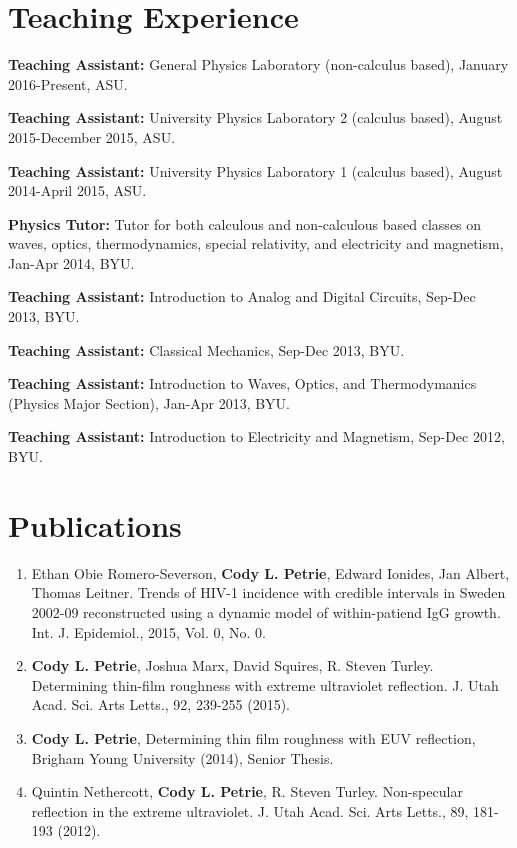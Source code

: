 \documentclass[letterpaper,10pt]{article}
\renewenvironment{itemize}{
  \begin{list}{}{
    \setlength{\leftmargin}{1.5em}
  }
}{
  \end{list}
}
\begin{document}
\section*{Teaching Experience}
\begin{itemize}
  \item \textbf{Teaching Assistant:} General Physics Laboratory (non-calculus based), January 2016-Present, ASU.
  \item \textbf{Teaching Assistant:} University Physics Laboratory 2 (calculus based), August 2015-December 2015, ASU.
  \item \textbf{Teaching Assistant:} University Physics Laboratory 1 (calculus based), August 2014-April 2015, ASU.
  \item \textbf{Physics Tutor:} Tutor for both calculous and non-calculous based classes on waves, optics, thermodynamics, special relativity, and electricity and magnetism, Jan-Apr 2014, BYU.
  \item \textbf{Teaching Assistant:} Introduction to Analog and Digital Circuits, Sep-Dec 2013, BYU.
  \item \textbf{Teaching Assistant:} Classical Mechanics, Sep-Dec 2013, BYU.
  \item \textbf{Teaching Assistant:} Introduction to Waves, Optics, and Thermodymanics (Physics Major Section), Jan-Apr 2013, BYU.
  \item \textbf{Teaching Assistant:} Introduction to Electricity and Magnetism, Sep-Dec 2012, BYU.
\end{itemize}

\section*{Publications}
\begin{enumerate}
   \item Ethan Obie Romero-Severson, \textbf{Cody L. Petrie}, Edward Ionides, Jan Albert, Thomas Leitner. Trends of HIV-1 incidence with credible intervals in Sweden 2002-09 reconstructed using a dynamic model of within-patiend IgG growth. Int. J. Epidemiol., 2015, Vol. 0, No. 0.
   \item  \textbf{Cody L. Petrie}, Joshua Marx, David Squires, R. Steven Turley. Determining thin-film roughness with extreme ultraviolet reflection. J. Utah Acad. Sci. Arts Letts., 92, 239-255 (2015).
   \item \textbf{Cody L. Petrie}, Determining thin film roughness with EUV reflection, Brigham Young University (2014), Senior Thesis.
   \item  Quintin Nethercott, \textbf{Cody L. Petrie}, R. Steven Turley. Non-specular reflection in the extreme ultraviolet. J. Utah Acad. Sci. Arts Letts., 89, 181-193 (2012).
\end{enumerate}
\end{document}
